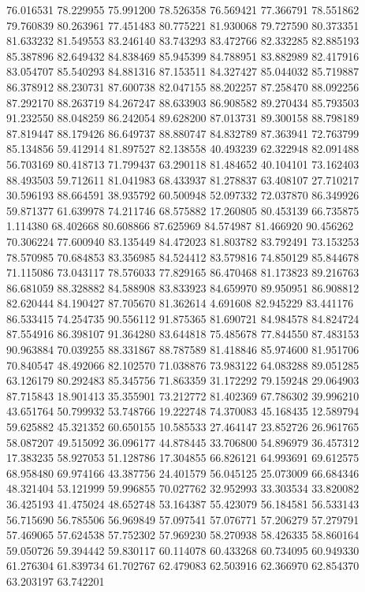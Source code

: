 76.016531
78.229955
75.991200
78.526358
76.569421
77.366791
78.551862
79.760839
80.263961
77.451483
80.775221
81.930068
79.727590
80.373351
81.633232
81.549553
83.246140
83.743293
83.472766
82.332285
82.885193
85.387896
82.649432
84.838469
85.945399
84.788951
83.882989
82.417916
83.054707
85.540293
84.881316
87.153511
84.327427
85.044032
85.719887
86.378912
88.230731
87.600738
82.047155
88.202257
87.258470
88.092256
87.292170
88.263719
84.267247
88.633903
86.908582
89.270434
85.793503
91.232550
88.048259
86.242054
89.628200
87.013731
89.300158
88.798189
87.819447
88.179426
86.649737
88.880747
84.832789
87.363941
72.763799
85.134856
59.412914
81.897527
82.138558
40.493239
62.322948
82.091488
56.703169
80.418713
71.799437
63.290118
81.484652
40.104101
73.162403
88.493503
59.712611
81.041983
68.433937
81.278837
63.408107
27.710217
30.596193
88.664591
38.935792
60.500948
52.097332
72.037870
86.349926
59.871377
61.639978
74.211746
68.575882
17.260805
80.453139
66.735875
1.114380
68.402668
80.608866
87.625969
84.574987
81.466920
90.456262
70.306224
77.600940
83.135449
84.472023
81.803782
83.792491
73.153253
78.570985
70.684853
83.356985
84.524412
83.579816
74.850129
85.844678
71.115086
73.043117
78.576033
77.829165
86.470468
81.173823
89.216763
86.681059
88.328882
84.588908
83.833923
84.659970
89.950951
86.908812
82.620444
84.190427
87.705670
81.362614
4.691608
82.945229
83.441176
86.533415
74.254735
90.556112
91.875365
81.690721
84.984578
84.824724
87.554916
86.398107
91.364280
83.644818
75.485678
77.844550
87.483153
90.963884
70.039255
88.331867
88.787589
81.418846
85.974600
81.951706
70.840547
48.492066
82.102570
71.038876
73.983122
64.083288
89.051285
63.126179
80.292483
85.345756
71.863359
31.172292
79.159248
29.064903
87.715843
18.901413
35.355901
73.212772
81.402369
67.786302
39.996210
43.651764
50.799932
53.748766
19.222748
74.370083
45.168435
12.589794
59.625882
45.321352
60.650155
10.585533
27.464147
23.852726
26.961765
58.087207
49.515092
36.096177
44.878445
33.706800
54.896979
36.457312
17.383235
58.927053
51.128786
17.304855
66.826121
64.993691
69.612575
68.958480
69.974166
43.387756
24.401579
56.045125
25.073009
66.684346
48.321404
53.121999
59.996855
70.027762
32.952993
33.303534
33.820082
36.425193
41.475024
48.652748
53.164387
55.423079
56.184581
56.533143
56.715690
56.785506
56.969849
57.097541
57.076771
57.206279
57.279791
57.469065
57.624538
57.752302
57.969230
58.270938
58.426335
58.860164
59.050726
59.394442
59.830117
60.114078
60.433268
60.734095
60.949330
61.276304
61.839734
61.702767
62.479083
62.503916
62.366970
62.854370
63.203197
63.742201
